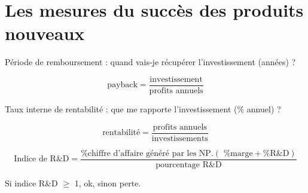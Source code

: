 				
	\section{Les mesures du succès des produits nouveaux}
	
	Période de remboursement : quand vais-je récupérer l'investissement (années) ?
	
	$$\text{payback} = \frac{\text{investissement}}{\text{profits annuels}}$$
	
	Taux interne de rentabilité : que me rapporte l'investissement (\% annuel) ?
	
	$$\text{rentabilité} = \frac{\text{profits annuels}}{\text{investissements}}$$
		
	$$\text{Indice de R\&D} = \frac{  \text{\% chiffre d'affaire généré par les NP} . (\text{ \% marge} + \text{\% R\&D})}{ \text{pourcentage R\&D}}$$
		
	Si indice R\&D $\geq$ 1, ok, sinon perte.
		